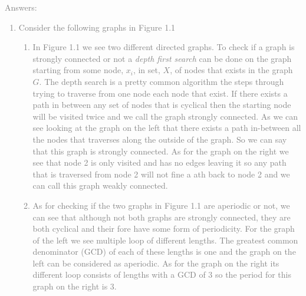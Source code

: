\documentclass[11pt]{article}
\begin{document}
\textcolor{gray}{
Answers:
\begin{enumerate}
	\item Consider the following graphs in Figure 1.1
	\begin{enumerate}[a]
		\item In Figure 1.1 we see two different directed graphs.  To check if a graph is strongly connected or not a \textit{depth first search} can be done on the graph starting from some node, $x_i$, in set, $X$, of nodes that exists in the graph $G$.  The depth search is a pretty common algorithm the steps through trying to traverse from one node each node that exist. If there exists a path in between any set of nodes that is cyclical then the starting node will be visited twice and we call the graph strongly connected.  As we can see looking at the graph on the left that there exists a path in-between all the nodes that traverses along the outside of the graph. So we can say that this graph is strongly connected.  As for the graph on the right we see that node 2 is only visited and has no edges leaving it so any path that is traversed from node 2 will not fine a ath back to node 2 and we can call this graph weakly connected. 
		\item As for checking if the two graphs in Figure 1.1 are aperiodic or not, we can see that although not both graphs are strongly connected, they are both cyclical and their fore have some form of periodicity.  For the graph of the left we see multiple loop of different lengths.  The greatest common denominator (GCD) of each of these lengths is one and the graph on the left can be considered as aperiodic.  As for the graph on the right its different loop consists of lengths with a GCD of 3 so the period for this graph on the right is 3.
	\end{enumerate}
\end{enumerate}
}
\end{document}
